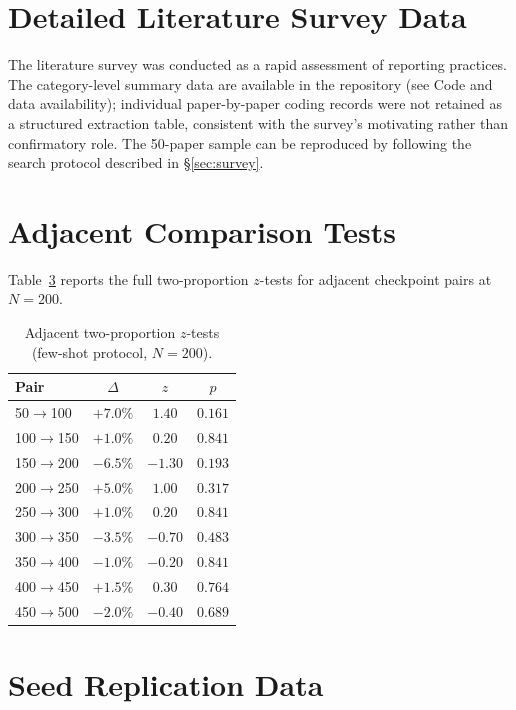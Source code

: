 \documentclass[pdflatex,sn-mathphys-ay,iicol]{sn-jnl}
\theoremstyle{thmstylethree}
\begin{document}
\begin{table}[t]
\begin{table}[t]
\section{Detailed Literature Survey Data}\label{app:audit}

The literature survey was conducted as a rapid assessment of reporting practices. The category-level summary data are available in the repository (see Code and data availability); individual paper-by-paper coding records were not retained as a structured extraction table, consistent with the survey's motivating rather than confirmatory role. The 50-paper sample can be reproduced by following the search protocol described in \S\ref{sec:survey}.

\section{Adjacent Comparison Tests}\label{app:adjacent}

Table~\ref{tab:adjacent} reports the full two-proportion $z$-tests for adjacent checkpoint pairs at $N=200$.

\begin{table}[ht]
\centering
\caption{Adjacent two-proportion $z$-tests (few-shot protocol, $N=200$).}
\label{tab:adjacent}
\begin{tabular}{lccc}\toprule
\textbf{Pair} & $\Delta$ & $z$ & $p$ \\\midrule
50$\to$100  & $+7.0\%$ & $1.40$ & $0.161$ \\
100$\to$150 & $+1.0\%$ & $0.20$ & $0.841$ \\
150$\to$200 & $-6.5\%$ & $-1.30$ & $0.193$ \\
200$\to$250 & $+5.0\%$ & $1.00$ & $0.317$ \\
250$\to$300 & $+1.0\%$ & $0.20$ & $0.841$ \\
300$\to$350 & $-3.5\%$ & $-0.70$ & $0.483$ \\
350$\to$400 & $-1.0\%$ & $-0.20$ & $0.841$ \\
400$\to$450 & $+1.5\%$ & $0.30$ & $0.764$ \\
450$\to$500 & $-2.0\%$ & $-0.40$ & $0.689$ \\\bottomrule
\end{tabular}
\end{table}

\section{Seed Replication Data}\label{app:seed}


\end{table}
\end{table}
\end{document}
